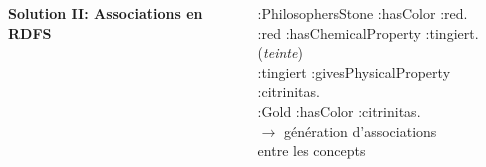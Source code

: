\documentclass[25pt, a0paper, portrait,innermargin=35mm,
blockverticalspace=30mm, colspace=90mm, subcolspace=3mm]{tikzposter}
\begin{document}
\begin{columns}
{{\bf\large Solution II: Associations en RDFS}

:PhilosophersStone :hasColor :red. \\
:red :hasChemicalProperty :tingiert. (\emph{teinte}) \\
:tingiert :givesPhysicalProperty :citrinitas. \\
:Gold :hasColor :citrinitas.\\[1em]

$\to$ génération d'associations \\ \phantom{xxxx} entre les concepts

}

\end{columns}
\begin{columns}
\end{columns}
\end{document}
